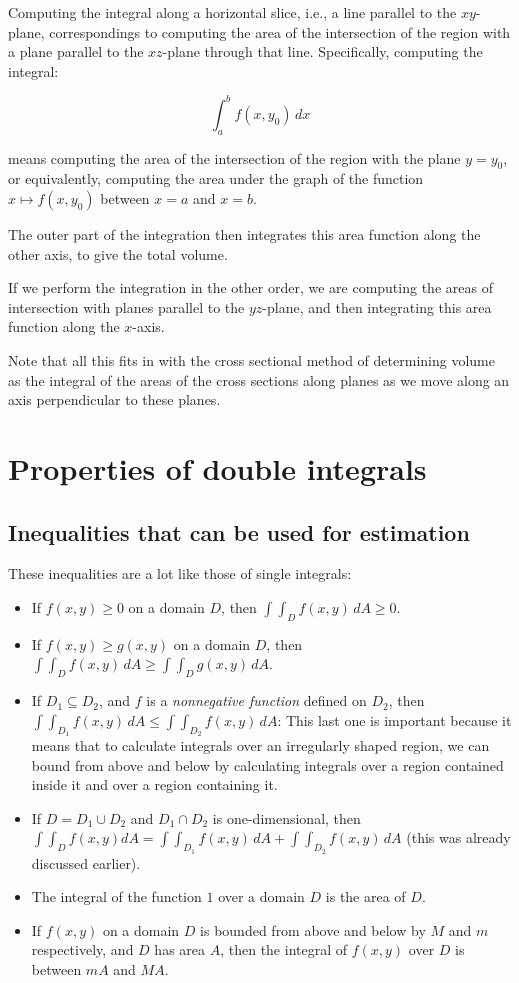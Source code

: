 \documentclass[10pt]{amsart}
\begin{document}
Computing the integral along a horizontal slice, i.e., a line parallel
to the $xy$-plane, correspondings to computing the area of the
intersection of the region with a plane parallel to the $xz$-plane
through that line. Specifically, computing the integral:

$$\int_a^b f(x,y_0) \, dx$$

means computing the area of the intersection of the region with the
plane $y = y_0$, or equivalently, computing the area under the graph
of the function $x \mapsto f(x,y_0)$ between $x = a$ and $x = b$.

The outer part of the integration then integrates this area function
along the other axis, to give the total volume.

If we perform the integration in the other order, we are computing the
areas of intersection with planes parallel to the $yz$-plane, and then
integrating this area function along the $x$-axis.

Note that all this fits in with the cross sectional method of
determining volume as the integral of the areas of the cross sections
along planes as we move along an axis perpendicular to these planes.

\section{Properties of double integrals}

\subsection{Inequalities that can be used for estimation}

These inequalities are a lot like those of single integrals:

\begin{itemize}
\item If $f(x,y) \ge 0$ on a domain $D$, then $\int \int_D f(x,y) \,
  dA \ge 0$.
\item If $f(x,y) \ge g(x,y)$ on a domain $D$, then $\int \int_D f(x,y)
  \, dA \ge \int \int_D g(x,y) \, dA$.
\item If $D_1 \subseteq D_2$, and $f$ is a {\em nonnegative function}
  defined on $D_2$, then $\int \int_{D_1} f(x,y) \, dA \le \int
  \int_{D_2} f(x,y) \, dA$: This last one is important because it
  means that to calculate integrals over an irregularly shaped region,
  we can bound from above and below by calculating integrals over a
  region contained inside it and over a region containing it.
\item If $D = D_1 \cup D_2$ and $D_1 \cap D_2$ is one-dimensional,
  then $\int \int_D f(x,y) dA = \int \int_{D_1} f(x,y) \, dA +
  \int \int_{D_2} f(x,y) \, dA$ (this was already discussed earlier).
\item The integral of the function $1$ over a domain $D$ is the area of $D$.
\item If $f(x,y)$ on a domain $D$ is bounded from above and below by
  $M$ and $m$ respectively, and $D$ has area $A$, then the integral of
  $f(x,y)$ over $D$ is between $mA$ and $MA$.
\end{itemize}
\end{document}
